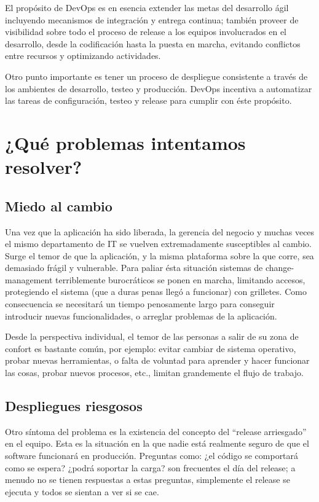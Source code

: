 \documentclass[conference]{IEEEtran}
\begin{document}
El propósito de DevOps es en esencia extender las metas del desarrollo ágil incluyendo mecanismos de integración y entrega continua; también proveer de visibilidad sobre todo el proceso de release a los equipos involucrados en el desarrollo, desde la codificación hasta la puesta en marcha, evitando conflictos entre recursos y optimizando actividades. 

Otro punto importante es tener un proceso de despliegue consistente a través de los ambientes de desarrollo, testeo y producción. DevOps incentiva a automatizar las tareas de configuración, testeo y release para cumplir con éste propósito.

\section{¿Qué problemas intentamos resolver?}

\subsection{Miedo al cambio}

Una vez que la aplicación ha sido liberada, la gerencia del negocio y muchas veces el mismo departamento de IT se vuelven extremadamente susceptibles al cambio. Surge el temor de que la aplicación, y la misma plataforma sobre la que corre, sea demasiado frágil y vulnerable. Para paliar ésta situación sistemas de change-management terriblemente burocráticos se ponen en marcha, limitando accesos, protegiendo el sistema (que a duras penas llegó a funcionar) con grilletes. Como consecuencia se necesitará un tiempo penosamente largo para conseguir introducir nuevas funcionalidades, o arreglar problemas de la aplicación.

Desde la perspectiva individual, el temor de las personas a salir de su zona de confort es bastante común, por ejemplo: evitar cambiar de sistema operativo, probar nuevas herramientas, o falta de voluntad para aprender y hacer funcionar las cosas, probar nuevos procesos, etc., limitan grandemente el flujo de trabajo.

\subsection{Despliegues riesgosos}

Otro síntoma del problema es la existencia del concepto del “release arriesgado” en el equipo. Esta es la situación en la que nadie está realmente seguro de que el software funcionará en producción. Preguntas como: ¿el código se comportará como se espera? ¿podrá soportar la carga? son frecuentes el día del release; a menudo no se tienen respuestas a estas preguntas, simplemente el release se ejecuta y todos se sientan a ver si se cae.
\end{document}
